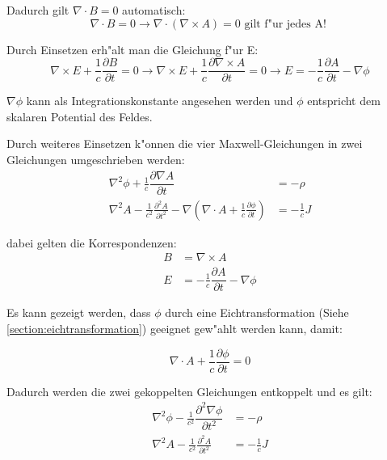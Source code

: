 Dadurch gilt $\nabla \cdot B = 0 $ automatisch:
\begin{equation}
\nabla \cdot B = 0 \rightarrow \nabla \cdot ( \nabla\times A ) = 0 \text{ gilt f"ur jedes A! }
\end{equation}

Durch Einsetzen erh"alt man die Gleichung f"ur E:
\begin{equation}
\nabla\times E + \frac{1}{c} \frac{\partial B }{\partial t} = 0
\rightarrow \nabla\times E + \frac{1}{c} \frac{\partial \nabla\times A }{\partial t} = 0 \rightarrow E = -\frac{1}{c} \dfrac{\partial A}{\partial t} - \nabla \phi
\end{equation}

$\nabla \phi$ kann als Integrationskonstante angesehen werden und $\phi$ entspricht dem skalaren Potential des Feldes.

Durch weiteres Einsetzen k"onnen die vier Maxwell-Gleichungen in zwei Gleichungen umgeschrieben werden:
\begin{equation}
\begin{split}
 \nabla^2 \phi + \frac{1}{c} \dfrac{\partial \nabla A}{\partial t} &= -\rho \\
 \nabla^2 A - \frac{1}{c^2} \frac{\partial^2 A }{\partial t^2} - \nabla \left( \nabla \cdot A + \frac{1}{c} \frac{\partial \phi }{\partial t} \right) &= - \frac{1}{c} J
\end{split}
\end{equation}

dabei gelten die Korrespondenzen:
\begin{equation}
\begin{split}
B &= \nabla\times A \\
E &= -\frac{1}{c} \dfrac{\partial A}{\partial t} - \nabla \phi
\end{split}
\end{equation}

Es kann gezeigt werden, dass $\phi$ durch eine Eichtransformation (Siehe \ref{section:eichtransformation}) geeignet gew"ahlt werden kann, damit:

\begin{equation}
\nabla \cdot A + \frac{1}{c} \frac{\partial \phi }{\partial t} = 0
\end{equation}

Dadurch werden die zwei gekoppelten Gleichungen entkoppelt und es gilt:
\begin{equation}
\begin{split}
\nabla^2 \phi - \frac{1}{c^2} \dfrac{\partial^2 \nabla \phi}{\partial t^2} &= -\rho \\
\nabla^2 A - \frac{1}{c^2} \frac{\partial^2 A }{\partial t^2} &= - \frac{1}{c} J
\end{split}
\end{equation}

